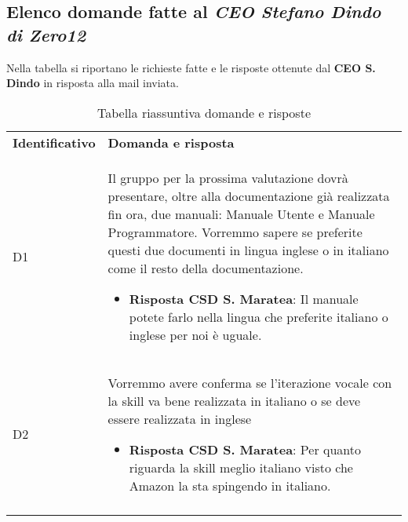 	\subsection{Elenco domande fatte al \emph{CEO Stefano Dindo di Zero12}}
	\label{sec:elenco}
	Nella tabella si riportano le richieste fatte e le risposte ottenute dal \textbf{CEO S. Dindo} in risposta alla mail inviata.
		\begin{center}
			\renewcommand{\arraystretch}{1.5}
			\begin{longtable}{  p{2.5cm} p{11.7cm} }
				\rowcolor{tableHeadYellow}
				\textbf{Identificativo}&\textbf{Domanda e risposta}\\
				D1 & Il gruppo per la prossima valutazione dovrà presentare, oltre alla documentazione già realizzata fin ora, due manuali: Manuale Utente e Manuale Programmatore. Vorremmo sapere se preferite questi due documenti in lingua inglese o in italiano come il resto della documentazione.
				\begin{itemize}
					\item \textbf{Risposta CSD S. Maratea}: Il manuale potete farlo nella lingua che preferite italiano o inglese per noi è uguale.
				\end{itemize}
				\\
				D2 & Vorremmo avere conferma se l'iterazione vocale con la skill va bene realizzata in italiano o se deve essere realizzata in inglese
				\begin{itemize}
					\item \textbf{Risposta CSD S. Maratea}: Per quanto riguarda la skill meglio italiano visto che Amazon la sta spingendo in italiano.
				\end{itemize}
				\\
				\rowcolor{white}
				\caption{Tabella riassuntiva domande e risposte}
			\end{longtable}	
		\end{center}
	
	
